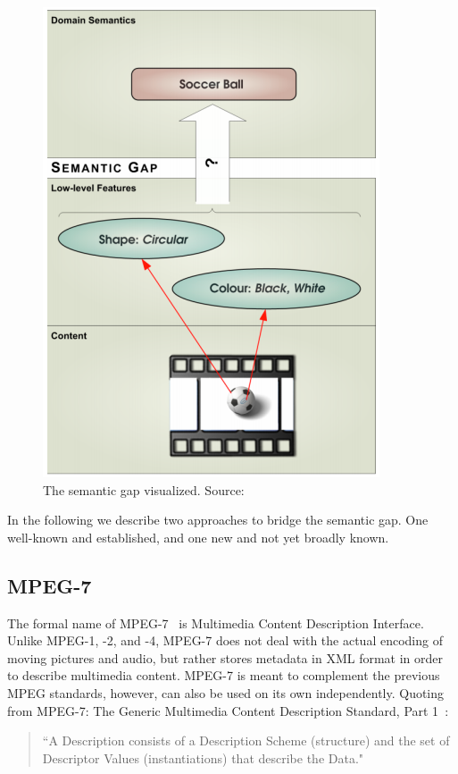 \documentclass[12pt]{article}
\begin{document}
\begin{figure}[htbp!]
\begin{center}
 \includegraphics[width=0.4\linewidth]{./resources/semantic-gap.png}
 \caption[The semantic gap visualized.]{The semantic gap visualized. Source:~\cite{Hausenblas:PhD08}}
  \label{fig:semantic-gap}
  \end{center}  
\end{figure}

In the following we describe two approaches to bridge the semantic gap. One well-known and established, and one new and not yet broadly known.

\subsection{MPEG-7}
The formal name of MPEG-7~\cite{mpeg7} is Multimedia Content Description Interface. Unlike MPEG-1, -2, and -4, MPEG-7 does not deal with the actual encoding of moving pictures and audio, but rather stores metadata in XML format in order to describe multimedia content. MPEG-7 is meant to complement the previous MPEG standards, however, can also be used on its own independently. Quoting from MPEG-7: The Generic Multimedia Content Description Standard, Part 1~\cite{mpeg7}:
\begin{quotation}
\noindent ``A Description consists of a Description Scheme (structure) and the set of Descriptor Values (instantiations) that describe the Data."
\end{quotation}
\end{document}
